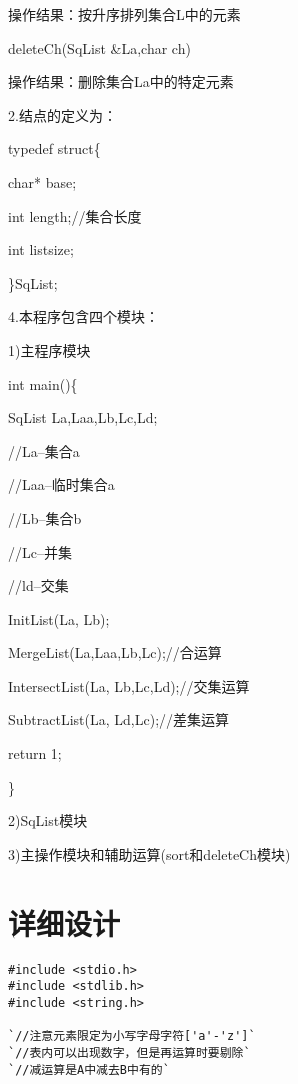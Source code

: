 \documentclass[11pt,letterpaper]{ctexart}
\begin{document}
{\indent\indent\indent\indent 操作结果：按升序排列集合L中的元素

\indent\indent\indent   deleteCh(SqList \&La,char ch)

\indent\indent\indent\indent 操作结果：删除集合La中的特定元素

    2.结点的定义为：

\indent\indent    typedef struct\{

\indent\indent\indent	char* base;

\indent\indent\indent	int length;//集合长度 

\indent\indent\indent	int listsize;  

\indent\indent   \}SqList; 

    4.本程序包含四个模块：

    1)主程序模块

\indent\indent    int main()\{

\indent\indent\indent	SqList La,Laa,Lb,Lc,Ld;

\indent\indent\indent	//La--集合a

\indent\indent\indent	//Laa--临时集合a

\indent\indent\indent	//Lb--集合b

\indent\indent\indent	//Lc--并集

\indent\indent\indent	//ld--交集

\indent\indent\indent	InitList(La, Lb);\newline
	

\indent\indent\indent	MergeList(La,Laa,Lb,Lc);//合运算

\indent\indent\indent	IntersectList(La, Lb,Lc,Ld);//交集运算

\indent\indent\indent	SubtractList(La, Ld,Lc);//差集运算\newline

\indent\indent\indent	return 1;

\indent\indent    \}

    2)SqList模块

    3)主操作模块和辅助运算(sort和deleteCh模块)
    \section{详细设计}
\begin{lstlisting}
#include <stdio.h>
#include <stdlib.h>
#include <string.h>

`//注意元素限定为小写字母字符['a'-'z']`
`//表内可以出现数字，但是再运算时要剔除`
`//减运算是A中减去B中有的`


\end{lstlisting}}
\end{document}
